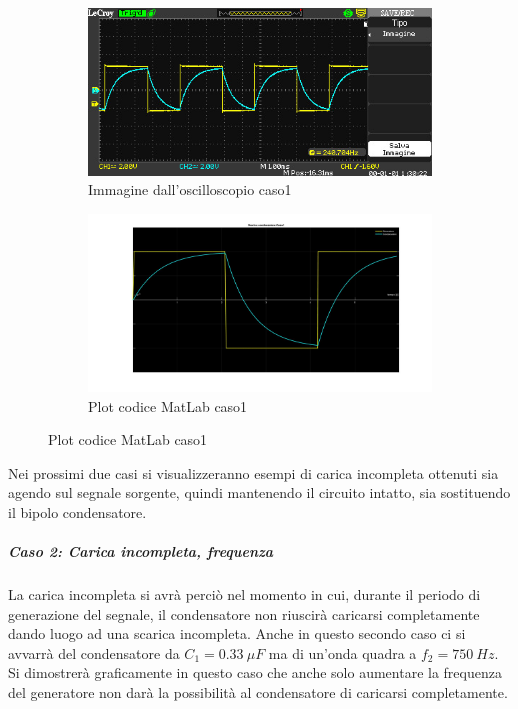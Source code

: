 \documentclass[a4paper, 12pt, twoside]{report}
\begin{document}
{\begin{figure}[H]
	\begin{subfigure}{1\textwidth}
		\centering
		\includegraphics[width=1\linewidth]{Esperienza/ImmaginiOscilloscopio/Caso1}  
		\caption{Immagine dall'oscilloscopio caso1}
		\label{fig:sub1}
	\end{subfigure}
	\begin{subfigure}{1\textwidth}
		\centering
		\includegraphics[width=1\linewidth]{Esperienza/MLcaso1}
		\caption{Plot codice MatLab caso1}
		\label{fig:sub2}
	\end{subfigure}
\end{figure}
 

 
   Nei prossimi due casi si visualizzeranno esempi di carica incompleta ottenuti sia agendo sul segnale sorgente, quindi mantenendo il circuito intatto, sia sostituendo il bipolo condensatore.
 
 \subparagraph{Caso 2: Carica incompleta, frequenza} \mbox{} \newline
 
 La carica incompleta si avrà perciò nel momento in cui, durante il periodo di generazione del segnale, il condensatore non riuscirà caricarsi completamente dando luogo ad una scarica incompleta.
 Anche in questo secondo caso ci si avvarrà del condensatore da $C_{1}=0.33 ~\mu F$ ma di un'onda quadra a $f_{2}=750 ~Hz$. 
 Si dimostrerà graficamente in questo caso che anche solo aumentare la frequenza del generatore non darà la possibilità al condensatore di caricarsi completamente.
   
}
\end{document}
